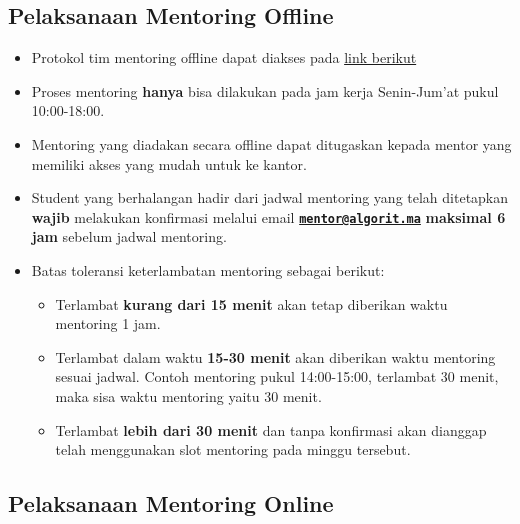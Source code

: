 \documentclass[
]{book}
\providecommand{\tightlist}{%
  \setlength{\itemsep}{0pt}\setlength{\parskip}{0pt}}
\begin{document}
\hypertarget{pelaksanaan-mentoring-offline}{%
\subsection{Pelaksanaan Mentoring Offline}\label{pelaksanaan-mentoring-offline}}

\begin{itemize}
\tightlist
\item
  Protokol tim mentoring offline dapat diakses pada \href{https://docs.google.com/document/d/1L6lA0MJoyhfeYlzFBf-TuuJ8SGhZE4Yc49_kXDWkkLw/edit?usp=sharing}{link berikut}
\item
  Proses mentoring \textbf{hanya} bisa dilakukan pada jam kerja Senin-Jum'at pukul 10:00-18:00.
\item
  Mentoring yang diadakan secara offline dapat ditugaskan kepada mentor yang memiliki akses yang mudah untuk ke kantor.
\item
  Student yang berhalangan hadir dari jadwal mentoring yang telah ditetapkan \textbf{wajib} melakukan konfirmasi melalui email \textbf{\href{mailto:mentor@algorit.ma}{\nolinkurl{mentor@algorit.ma}}} \textbf{maksimal 6 jam} sebelum jadwal mentoring.
\item
  Batas toleransi keterlambatan mentoring sebagai berikut:

  \begin{itemize}
  \tightlist
  \item
    Terlambat \textbf{kurang dari 15 menit} akan tetap diberikan waktu mentoring 1 jam.
  \item
    Terlambat dalam waktu \textbf{15-30 menit} akan diberikan waktu mentoring sesuai jadwal. Contoh mentoring pukul 14:00-15:00, terlambat 30 menit, maka sisa waktu mentoring yaitu 30 menit.
  \item
    Terlambat \textbf{lebih dari 30 menit} dan tanpa konfirmasi akan dianggap telah menggunakan slot mentoring pada minggu tersebut.
  \end{itemize}
\end{itemize}

\hypertarget{pelaksanaan-mentoring-online}{%
\subsection{Pelaksanaan Mentoring Online}\label{pelaksanaan-mentoring-online}}
\end{document}
